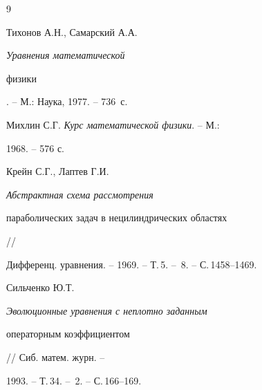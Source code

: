 \begin{thebibliography}{9}







Тихонов А.Н., Самарский А.А. {\em Уравнения математической


физики}. -- М.: Наука, 1977. -- 736~с.




Михлин С.Г. {\em Курс математической физики}. -- М.:


1968. -- 576 с.




Крейн С.Г., Лаптев Г.И. {\em Абстрактная схема рассмотрения


параболических задач в нецилиндрических областях} //


Дифференц. уравнения. -- 1969. -- Т.\,5. -- \No\,8. -- С.\,1458--1469.




Сильченко Ю.Т. {\em Эволюционные уравнения с неплотно заданным


операторным коэффициентом} // Сиб. матем. журн. --


1993. -- Т.\,34. -- \No\,2. -- С.\,166--169.





\end{thebibliography}





\vskip 0.5cm














\label{end}





